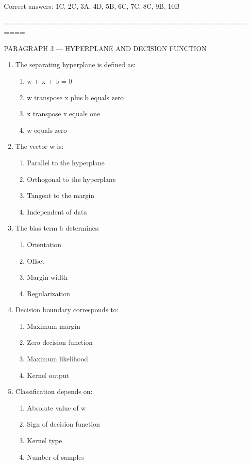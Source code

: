 \documentclass{article}
\begin{document}
	Correct answers: 1C, 2C, 3A, 4D, 5B, 6C, 7C, 8C, 9B, 10B
	
	\bigskip
	==================================================
	
	PARAGRAPH 3 — HYPERPLANE AND DECISION FUNCTION
	
	\begin{enumerate}
		\item The separating hyperplane is defined as:
		\begin{enumerate}
			\item w + x + b = 0
			\item w transpose x plus b equals zero
			\item x transpose x equals one
			\item w equals zero
		\end{enumerate}
		
		\item The vector w is:
		\begin{enumerate}
			\item Parallel to the hyperplane
			\item Orthogonal to the hyperplane
			\item Tangent to the margin
			\item Independent of data
		\end{enumerate}
		
		\item The bias term b determines:
		\begin{enumerate}
			\item Orientation
			\item Offset
			\item Margin width
			\item Regularization
		\end{enumerate}
		
		\item Decision boundary corresponds to:
		\begin{enumerate}
			\item Maximum margin
			\item Zero decision function
			\item Maximum likelihood
			\item Kernel output
		\end{enumerate}
		
		\item Classification depends on:
		\begin{enumerate}
			\item Absolute value of w
			\item Sign of decision function
			\item Kernel type
			\item Number of samples
		\end{enumerate}
		

\end{enumerate}
\end{document}
